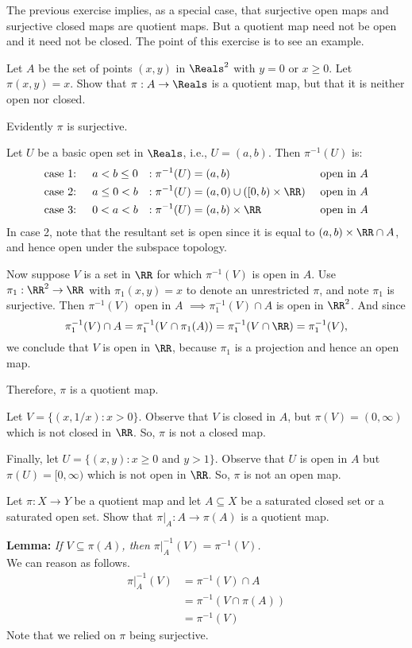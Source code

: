 \documentclass{homework651}
\newcommand\nextprob{\newpage}
\newcommand\ra{\rightarrow}
\begin{document}
\begin{aproblems}
\nextprob
\hproblem The previous exercise implies, as a special case, that surjective open
maps and surjective closed maps are quotient maps.  But a quotient map need not
be open and it need not be closed. The point of this exercise is to see an example.

Let $A$ be the set of points $(x,y)$ in $\Reals^2$ with $y=0$ or $x\ge 0$.
Let $\pi(x,y)=x$.
Show that $\pi:A\ra\Reals$ is a quotient map, but that it is neither open nor closed.

\solution
Evidently $\pi$ is surjective.

Let $U$ be a basic open set in $\Reals$, i.e., $U=(a,b)$.
Then $\pi^{-1}(U)$ is:
\begin{align*}
&\text{case 1: }\quad a<b\le 0 &: \pi^{-1}(U) &= (a,b) &\text { open in }A \\
&\text{case 2: }\quad a\le 0< b &: \pi^{-1}(U) &= (a,0)\cup([0,b)\times\RR) &\text{ open in }A\\
&\text{case 3: }\quad 0< a<b &: \pi^{-1}(U) &= (a,b)\times\RR &\text{ open in }A
\end{align*}
In case 2, note that the resultant set is open since it is equal to
$(a,b)\times\RR \cap A$, and hence open under the subspace topology.

Now suppose $V$ is a set in $\RR$ for which $\pi^{-1}(V)$ is open in $A$.
Use $\pi_1:\RR^2\ra\RR$ with $\pi_1(x,y)=x$ to denote an unrestricted $\pi$,
and note $\pi_1$ is surjective.  Then
$\pi^{-1}(V)$ open in $A$ $\implies \pi_1^{-1}(V)\cap A$ is open in $\RR^2$.
And since
$$ \pi_1^{-1}(V)\cap A = \pi_1^{-1}(V\cap \pi_1(A)) = \pi_1^{-1}(V\cap \RR)
 = \pi_1^{-1}(V), $$
we conclude that $V$ is open in $\RR$, because $\pi_1$ is a projection and
hence an open map.

Therefore, $\pi$ is a quotient map.

Let $V=\{(x,1/x):x>0\}$.  Observe that $V$ is closed in $A$, but $\pi(V)=(0,\infty)$
which is not closed in $\RR$.  So, $\pi$ is not a closed map.

Finally, let $U=\{(x,y):x\ge 0 \text{ and } y>1\}$.  Observe that $U$ is open
in $A$ but $\pi(U)=[0,\infty)$ which is not open in $\RR$.  So, $\pi$ is not
an open map.

\nextprob
\hproblem Let $\pi:X\rightarrow Y$ be a quotient map and let $A\subseteq X$
be a saturated closed set or a saturated open set.  Show that $\pi|_A:A\ra \pi(A)$
is a quotient map.

\textbf{Lemma:} \textit{If $V\subseteq \pi(A)$, then $\pi|_A^{-1}(V)=\pi^{-1}(V)$.}\\
We can reason as follows.
\begin{align}
 \pi|_A^{-1}(V) &= \pi^{-1}(V)\cap A \label{AAA}\\
                &= \pi^{-1}(V\cap \pi(A)) \nonumber\\
                &= \pi^{-1}(V)\nonumber
\end{align}
Note that we relied on $\pi$ being surjective.


\end{aproblems}
\end{document}
